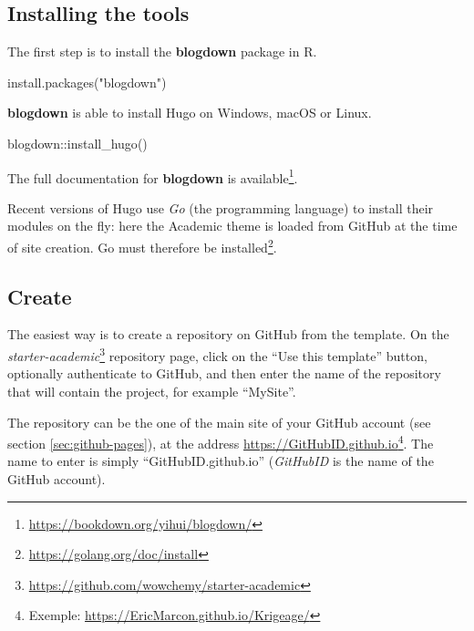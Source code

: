 \documentclass[
  12pt,
  american,
  a4paper,
  extrafontsizes,onecolumn,openright
  ]{memoir}
\newenvironment{Shaded}{\begin{snugshade}}{\end{snugshade}}
\newcommand{\FunctionTok}[1]{\textcolor[rgb]{0.00,0.00,0.00}{#1}}
\newcommand{\NormalTok}[1]{#1}
\newcommand{\SpecialCharTok}[1]{\textcolor[rgb]{0.00,0.00,0.00}{#1}}
\newcommand{\StringTok}[1]{\textcolor[rgb]{0.31,0.60,0.02}{#1}}
\begin{document}
\hypertarget{installing-the-tools}{%
\subsection{Installing the tools}\label{installing-the-tools}}

The first step is to install the \textbf{blogdown} package in R.

\scriptsize

\begin{Shaded}
\begin{Highlighting}[]
\FunctionTok{install.packages}\NormalTok{(}\StringTok{"blogdown"}\NormalTok{)}
\end{Highlighting}
\end{Shaded}

\normalsize

\textbf{blogdown} is able to install Hugo on Windows, macOS or Linux.

\scriptsize

\begin{Shaded}
\begin{Highlighting}[]
\NormalTok{blogdown}\SpecialCharTok{::}\FunctionTok{install\_hugo}\NormalTok{()}
\end{Highlighting}
\end{Shaded}

\normalsize

The full documentation for \textbf{blogdown} is available\footnote{\url{https://bookdown.org/yihui/blogdown/}}.

Recent versions of Hugo use \emph{Go} (the programming language) to install their modules on the fly: here the Academic theme is loaded from GitHub at the time of site creation.
Go must therefore be installed\footnote{\url{https://golang.org/doc/install}}.

\hypertarget{create-2}{%
\subsection{Create}\label{create-2}}

The easiest way is to create a repository on GitHub from the template.
On the \emph{starter-academic}\footnote{\url{https://github.com/wowchemy/starter-academic}} repository page, click on the \enquote{Use this template} button, optionally authenticate to GitHub, and then enter the name of the repository that will contain the project, for example \enquote{MySite}.

The repository can be the one of the main site of your GitHub account (see section \ref{sec:github-pages}), at the address \url{https://GitHubID.github.io}\footnote{Exemple: \url{https://EricMarcon.github.io/Krigeage/}}.
The name to enter is simply \enquote{GitHubID.github.io} (\emph{GitHubID} is the name of the GitHub account).
\end{document}
